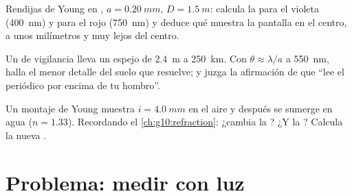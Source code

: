 \begin{exercise}[$\star\star\star$]\label{exo:g12:light-as-wave:13}
Rendijas de Young en , $a = \qty{0.20}{mm}$,
$D = \qty{1.5}{m}$: calcula la  para el violeta
(\qty{400}{nm}) y para el rojo (\qty{750}{nm}) y deduce qué muestra la
pantalla en el centro, a unos milímetros y muy lejos del centro.
\end{exercise}

\begin{exercise}[$\star\star\star$]\label{exo:g12:light-as-wave:14}
Un  de vigilancia lleva un espejo de \qty{2.4}{m} a
\qty{250}{km}. Con $\theta \approx \lambda/a$ a \qty{550}{nm}, halla el
menor detalle del suelo que resuelve; y juzga la afirmación de que
``lee el periódico por encima de tu hombro''.
\end{exercise}

\begin{exercise}[$\star\star\star$]\label{exo:g12:light-as-wave:15}
Un montaje de Young muestra $i = \qty{4.0}{mm}$ en el aire y después se
sumerge en agua ($n = 1.33$). Recordando el
\cref{ch:g10:refraction}: ¿cambia la ? ¿Y la ?
Calcula la nueva .
\end{exercise}

\section{Problema: medir con luz}

